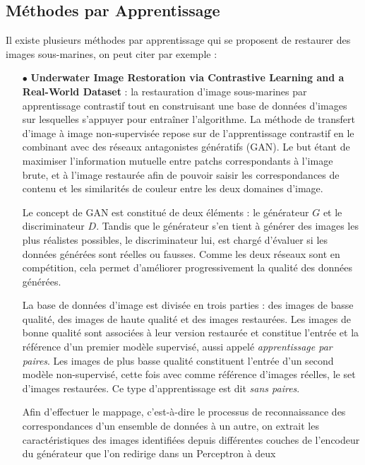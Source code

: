 \documentclass[10pt, a4paper]{extarticle}
\numberwithin{equation}{section}
\numberwithin{figure}{section}
\begin{document}
\subsection{Méthodes par Apprentissage}
\par Il existe plusieurs méthodes par apprentissage qui se proposent de restaurer des images sous-marines, on peut citer par exemple :
\vspace{2mm}
\begin{itemize}
\item[$\bullet$] \textbf{Underwater Image Restoration via Contrastive Learning and a Real-World Dataset} : la restauration d’image sous-marines par
apprentissage contrastif tout en construisant une base de données d’images sur lesquelles s’appuyer pour entraîner l’algorithme. La méthode de transfert d’image à image non-supervisée repose sur de l’apprentissage contrastif en le combinant avec des réseaux antagonistes génératifs (GAN). Le but étant de maximiser l’information mutuelle entre patchs correspondants à l’image brute, et à l’image restaurée afin de pouvoir saisir les correspondances de contenu et les similarités de couleur entre les
deux domaines d’image.
\vspace{3mm}
\par Le concept de GAN est constitué de deux éléments : le générateur $G$ et le discriminateur $D$. Tandis que le générateur s’en tient à générer des images les plus réalistes possibles, le discriminateur lui, est chargé d’évaluer si les données générées sont réelles ou fausses. Comme les deux réseaux sont en compétition, cela permet d’améliorer progressivement la qualité des données générées.
\par La base de données d’image est divisée en trois parties : des images de basse qualité, des images de haute qualité et des images restaurées. Les images de bonne qualité sont associées à leur version
restaurée et constitue l’entrée et la référence d’un premier modèle supervisé, aussi appelé
\textit{apprentissage par paires}. Les images de plus basse qualité constituent l’entrée d’un second
modèle non-supervisé, cette fois avec comme référence d’images réelles, le set d’images restaurées.
Ce type d’apprentissage est dit \textit{sans paires}.
\vspace{2mm}
\par Afin d’effectuer le mappage, c’est-à-dire le processus de reconnaissance des correspondances d’un
ensemble de données à un autre, on extrait les caractéristiques des images identifiées depuis
différentes couches de l’encodeur du générateur que l’on redirige dans un Perceptron à deux

\end{itemize}
\end{document}
